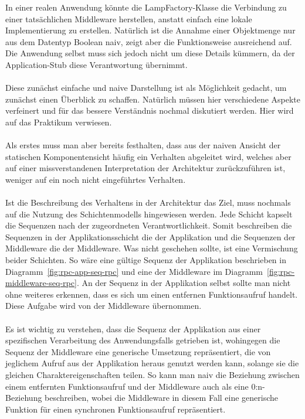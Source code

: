 \documentclass[../vs-script-first-v01.tex]{subfiles}
\begin{document}
In einer realen Anwendung könnte die LampFactory-Klasse die Verbindung zu einer tatsächlichen Middleware herstellen, anstatt einfach eine lokale Implementierung zu erstellen. Natürlich ist die Annahme einer Objektmenge nur aus dem Datentyp Boolean naiv, zeigt aber die Funktionsweise ausreichend auf. Die Anwendung selbst muss sich jedoch nicht um diese Details kümmern, da der Application-Stub diese Verantwortung übernimmt.
\\\\
Diese zunächst einfache und naive Darstellung ist als Möglichkeit gedacht, um zunächst einen Überblick zu schaffen. Natürlich müssen hier verschiedene Aspekte verfeinert und für das bessere Verständnis nochmal diskutiert werden. Hier wird auf das Praktikum verwiesen.
\\\\
Als erstes muss man aber bereits festhalten, dass aus der naiven Ansicht der statischen Komponentensicht häufig ein Verhalten abgeleitet wird, welches aber auf einer missverstandenen Interpretation der Architektur zurückzuführen ist, weniger auf ein noch nicht eingeführtes Verhalten.  
\\\\
Ist die Beschreibung des Verhaltens in der Architektur das Ziel, muss nochmals auf die Nutzung des Schichtenmodells hingewiesen werden. Jede Schicht kapselt die Sequenzen nach der zugeordneten Verantwortlichkeit.
Somit beschreiben die Sequenzen in der Applikationsschicht die der Applikation und die Sequenzen der Middleware die der Middleware. Was nicht geschehen sollte, ist eine Vermischung beider Schichten. So wäre eine gültige Sequenz der Applikation beschrieben in Diagramm~\ref{fig:rpc-app-seq-rpc} und eine der Middleware im Diagramm~\ref{fig:rpc-middleware-seq-rpc}. An der Sequenz in der Applikation selbst sollte man nicht ohne weiteres erkennen, dass es sich um einen entfernen Funktionsaufruf handelt. Diese Aufgabe wird von der Middleware übernommen.
\\\\
Es ist wichtig zu verstehen, dass die Sequenz der Applikation aus einer spezifischen Verarbeitung des Anwendungsfalls getrieben ist, wohingegen die Sequenz der Middleware eine generische Umsetzung repräsentiert, die von jeglichem Aufruf aus der Applikation heraus genutzt werden kann, solange sie die gleichen Charaktereigenschaften teilen. So kann man naiv die Beziehung zwischen einem entfernten Funktionsaufruf und der Middleware auch als eine 0:n- Beziehung beschreiben, wobei die Middleware  in diesem Fall eine generische Funktion für einen synchronen Funktionsaufruf repräsentiert. \\\\
\end{document}
